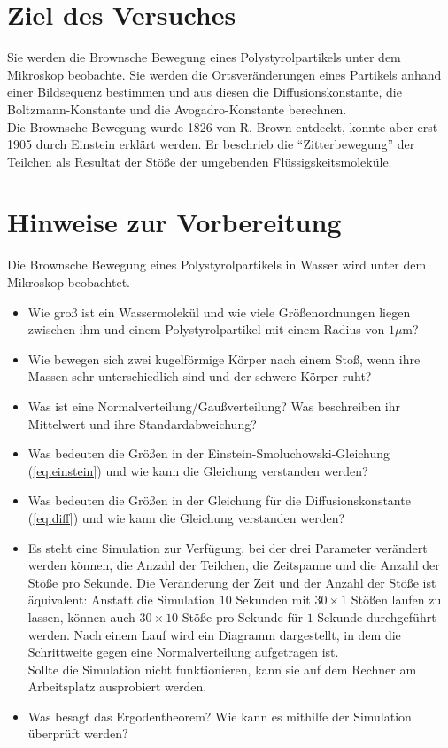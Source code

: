 \section*{Ziel des Versuches}

Sie werden die Brownsche Bewegung eines Polystyrolpartikels unter dem Mikroskop beobachte. Sie werden  die Ortsveränderungen eines Partikels anhand einer Bildsequenz bestimmen und aus diesen die Diffusionskonstante, die Boltzmann-Konstante und die Avogadro-Konstante berechnen.\\
Die Brownsche Bewegung wurde 1826 von R. Brown entdeckt, konnte aber erst 1905 durch Einstein erklärt werden. Er beschrieb die ``Zitterbewegung'' der Teilchen als Resultat der Stöße der umgebenden Flüssigskeitsmoleküle.

\section*{Hinweise zur Vorbereitung}
Die Brownsche Bewegung eines Polystyrolpartikels in Wasser wird unter dem Mikroskop beobachtet.
\begin{itemize}
  \item Wie groß ist ein Wassermolekül und wie viele Größenordnungen liegen zwischen ihm und einem Polystyrolpartikel mit einem Radius von $1 \mu$m?
  \item Wie bewegen sich zwei kugelförmige Körper nach einem Stoß, wenn ihre Massen sehr unterschiedlich sind und der schwere Körper ruht?
  \item Was ist eine Normalverteilung/Gaußverteilung? Was beschreiben ihr Mittelwert und ihre Standardabweichung?
  \item Was bedeuten die Größen in der Einstein-Smoluchowski-Gleichung (\ref{eq:einstein}) und wie kann die Gleichung verstanden werden?
  \item Was bedeuten die Größen in der Gleichung für die Diffusionskonstante (\ref{eq:diff}) und wie kann die Gleichung verstanden werden?
  \item Es steht eine Simulation zur Verfügung, bei der drei Parameter verändert werden können, die Anzahl der Teilchen, die Zeitspanne und die Anzahl der Stöße pro Sekunde. Die Veränderung der Zeit und der Anzahl der Stöße ist äquivalent: Anstatt die Simulation $10$ Sekunden mit $30\times1$ Stößen laufen zu lassen, können auch $30\times10$ Stöße pro Sekunde für $1$ Sekunde durchgeführt werden. Nach einem Lauf wird ein Diagramm dargestellt, in dem die Schrittweite gegen eine Normalverteilung aufgetragen ist.\\
  Sollte die Simulation nicht funktionieren, kann sie auf dem Rechner am Arbeitsplatz ausprobiert werden.
  \item Was besagt das Ergodentheorem? Wie kann es mithilfe der Simulation überprüft werden?
\end{itemize}
